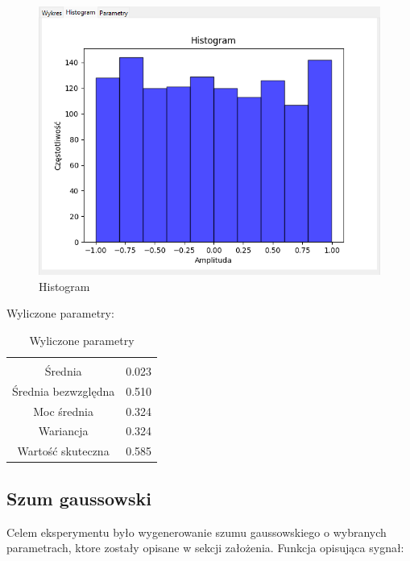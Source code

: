 \documentclass{article}
\begin{document}
    \begin{figure}[h!]
        \centering
        \includegraphics[width=\textwidth]{img/szum-jednost/hist.png}
        \caption{Histogram}
    \end{figure}
    \FloatBarrier
    Wyliczone parametry:
    \begin{table}[h!]
        \centering
        \vspace{0.2cm}
        \begin{tabular}{|c|c|}
            \hline\hline\\[-0.4cm]
            Średnia & 0.023  \\
            \hline
            Średnia bezwzględna & 0.510  \\
            \hline
            Moc średnia & 0.324  \\
            \hline
            Wariancja & 0.324 \\
            \hline
            Wartość skuteczna & 0.585 \\
            \hline
        \end{tabular}
        \caption{Wyliczone parametry}
        \label{szumjednostajny}
    \end{table}

\subsection{Szum gaussowski} \label{szumgaussowski} 
        Celem eksperymentu było wygenerowanie szumu gaussowskiego o wybranych parametrach,
        ktore zostały opisane w sekcji założenia. Funkcja opisująca sygnał:
\end{document}
